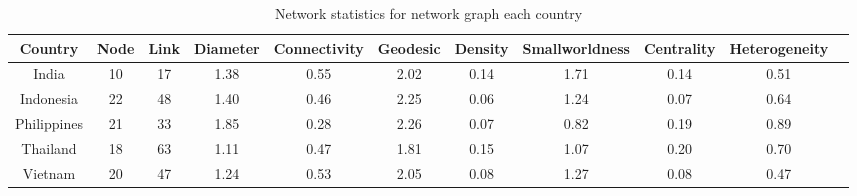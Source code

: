 \begin{table} 
    \begin{tabular}{ c c c c c c c c c c c }
    \hline
         Country & Node & Link & Diameter & Connectivity & Geodesic & Density & Smallworldness & Centrality & Heterogeneity \\ 
         \hline
         India & 10 & 17 & 1.38 & 0.55 & 2.02 & 0.14 & 1.71 & 0.14 & 0.51 \\
         Indonesia & 22 & 48 & 1.40 & 0.46 & 2.25 & 0.06 & 1.24 & 0.07 & 0.64 \\
         Philippines & 21 & 33 & 1.85 & 0.28 & 2.26 & 0.07 & 0.82 & 0.19 & 0.89 \\
         Thailand & 18 & 63 & 1.11 & 0.47 & 1.81 & 0.15 & 1.07 & 0.20 & 0.70 \\
         Vietnam & 20 & 47 & 1.24 & 0.53 & 2.05 & 0.08 & 1.27 & 0.08 & 0.47 \\ 
     \hline  
    \end{tabular} 
    \caption{Network statistics for network graph each country}
\label{table:Network_stat}
\end{table}